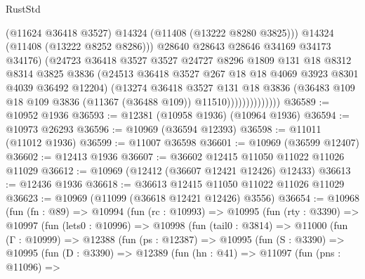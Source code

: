\begin{lexlean}{RustStd}
\begin{coremodule}
                                (@11624 @36418 @3527)
                                @14324
                                (@11408 (@13222 @8280 @3825)))
                              @14324
                              (@11408 (@13222 @8252 @8286)))
                            @28640
                            @28643
                            @28646
                            @34169
                            @34173
                            @34176)
                          (@24723
                            @36418
                            @3527
                            @3527
                            @24727
                            @8296
                            @1809
                            @131
                            @18
                            @8312
                            @8314
                            @3825
                            @3836
                            (@24513 @36418 @3527 @267 @18 @18 @4069 @3923 @8301 @4039 @36492 @12204)
                            (@13274
                              @36418
                              @3527
                              @131
                              @18
                              @3836
                              (@36483
                                @109
                                @18
                                @109
                                @3836
                                (@11367 (@36488 @109))
                                @11510))))))))))))))
@36589 := @10952 @1936
@36593 := @12381 (@10958 @1936) (@10964 @1936)
@36594 := @10973 @26293
@36596 := @10969 (@36594 @12393)
@36598 := @11011 (@11012 @1936)
@36599 := @11007 @36598
@36601 := @10969 (@36599 @12407)
@36602 := @12413 @1936
@36607 := @36602 @12415 @11050 @11022 @11026 @11029
@36612 := @10969 (@12412 (@36607 @12421 @12426) @12433)
@36613 := @12436 @1936
@36618 := @36613 @12415 @11050 @11022 @11026 @11029
@36623 := @10969 (@11099 (@36618 @12421 @12426) @3556)
@36654 := @10968
    (fun (fn : @89) =>
    @10994
      (fun (rc : @10993) =>
      @10995
        (fun (rty : @3390) =>
        @10997
          (fun (lets0 : @10996) =>
          @10998
            (fun (tail0 : @3814) =>
            @11000
              (fun (Γ : @10999) =>
              @12388
                (fun (ps : @12387) =>
                @10995
                  (fun (S : @3390) =>
                  @10995
                    (fun (D : @3390) =>
                    @12389
                      (fun (hn : @41) =>
                      @11097
                        (fun (pns : @11096) =>

\end{coremodule}
\end{lexlean}
